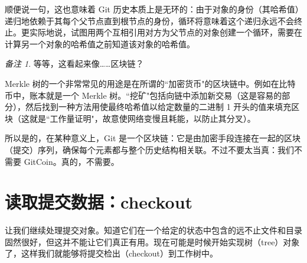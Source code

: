 \documentclass{ctexart}
\theoremstyle{remark}
\newtheorem*{remark}{备注}
\theoremstyle{warningstyle}
\theoremstyle{warningstyle}
\begin{document}
顺便说一句，这也意味着 Git 历史本质上是无环的：由于对象的身份（其哈希值）递归地依赖于其每个父节点直到根节点的身份，循环将意味着这个递归永远不会终止。更实际地说，试图用两个互相引用对方为父节点的对象创建一个循环，需要在计算另一个对象的哈希值之前知道该对象的哈希值。

    \begin{remark}等等，这看起来像……区块链？

    Merkle 树的一个非常常见的用途是在所谓的``加密货币"的区块链中。例如在比特币中，账本就是一个 Merkle 树。``挖矿"包括向链中添加新交易（这是容易的部分），然后找到一种方法用使最终哈希值以给定数量的二进制 1 开头的值来填充区块（这就是``工作量证明"，故意使网络变慢且耗能，以防止其分叉）。

    所以是的，在某种意义上，Git 是一个区块链：它是由加密手段连接在一起的区块（提交）序列，确保每个元素都与整个历史结构相关联。不过不要太当真：我们不需要 GitCoin。真的，不需要。
    \end{remark}

\section{读取提交数据：checkout}
让我们继续处理提交对象。知道它们在一个给定的状态中包含的远不止文件和目录固然很好，但这并不能让它们真正有用。现在可能是时候开始实现树（tree）对象了，这样我们就能够将提交检出（checkout）到工作树中。
\end{document}
